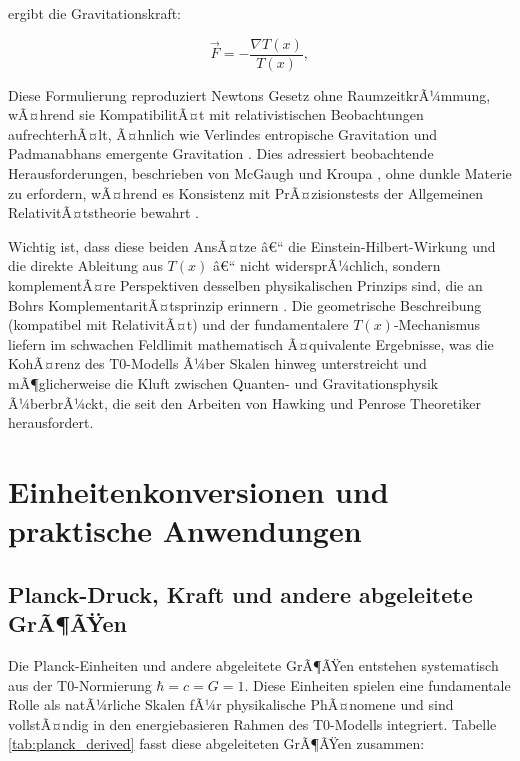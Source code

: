﻿\documentclass[twocolumn,aps,prl]{revtex4-2}
\begin{document}
{{{{{{{{{{{{{{{																	ergibt die Gravitationskraft:
																	
																	\begin{equation}
																		\vec{F} = -\frac{\nabla T(x)}{T(x)}, \label{eq:grav_force}
																	\end{equation}
																	
																	Diese Formulierung reproduziert Newtons Gesetz ohne RaumzeitkrÃ¼mmung, wÃ¤hrend sie KompatibilitÃ¤t mit relativistischen Beobachtungen aufrechterhÃ¤lt, Ã¤hnlich wie Verlindes entropische Gravitation \cite{Verlinde2011} und Padmanabhans emergente Gravitation \cite{Padmanabhan2012}. Dies adressiert beobachtende Herausforderungen, beschrieben von McGaugh \cite{McGaugh2011} und Kroupa \cite{Kroupa2012}, ohne dunkle Materie zu erfordern, wÃ¤hrend es Konsistenz mit PrÃ¤zisionstests der Allgemeinen RelativitÃ¤tstheorie bewahrt \cite{Will2014}.
																	
																	Wichtig ist, dass diese beiden AnsÃ¤tze â€“ die Einstein-Hilbert-Wirkung und die direkte Ableitung aus \(T(x)\) â€“ nicht widersprÃ¼chlich, sondern komplementÃ¤re Perspektiven desselben physikalischen Prinzips sind, die an Bohrs KomplementaritÃ¤tsprinzip erinnern \cite{Bohr1928}. Die geometrische Beschreibung (kompatibel mit RelativitÃ¤t) und der fundamentalere \(T(x)\)-Mechanismus liefern im schwachen Feldlimit mathematisch Ã¤quivalente Ergebnisse, was die KohÃ¤renz des T0-Modells Ã¼ber Skalen hinweg unterstreicht und mÃ¶glicherweise die Kluft zwischen Quanten- und Gravitationsphysik Ã¼berbrÃ¼ckt, die seit den Arbeiten von Hawking \cite{Hawking1975} und Penrose \cite{Penrose1965} Theoretiker herausfordert.
																	
																	\section{Einheitenkonversionen und praktische Anwendungen}
																	\label{sec:conversions}
																	
																	\subsection{Planck-Druck, Kraft und andere abgeleitete GrÃ¶ÃŸen}
																	\label{subsec:planck_derived}
																	
																	Die Planck-Einheiten und andere abgeleitete GrÃ¶ÃŸen entstehen systematisch aus der T0-Normierung \(\hbar = c = G = 1\). Diese Einheiten spielen eine fundamentale Rolle als natÃ¼rliche Skalen fÃ¼r physikalische PhÃ¤nomene und sind vollstÃ¤ndig in den energiebasieren Rahmen des T0-Modells integriert. Tabelle \ref{tab:planck_derived} fasst diese abgeleiteten GrÃ¶ÃŸen zusammen:
																	
}}}}}}}}}}}}}}}
\end{document}
